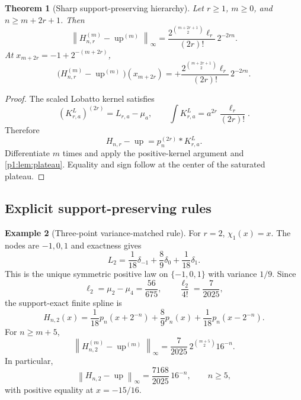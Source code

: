 \documentclass[11pt]{article}
\numberwithin{equation}{section}
\newtheorem{theorem}{Theorem}[section]
\theoremstyle{definition}
\newtheorem{example}[theorem]{Example}
\theoremstyle{remark}
\newcommand{\Up}{\operatorname{up}}
\newcommand{\norm}[1]{\left\lVert#1\right\rVert}
\begin{document}
\begin{theorem}[Sharp support-preserving hierarchy]
\label{p1:thm:L-exact}
Let $r\ge1$, $m\ge0$, and $n\ge m+2r+1$.  Then
\begin{equation}
 \boxed{
 \norm{H_{n,r}^{(m)}-\Up^{(m)}}_\infty
 =\frac{2^{\binom{m+2r+1}{2}}\ell_r}{(2r)!}\,2^{-2rn}.}
 \label{p1:eq:L-exact}
\end{equation}
At $x_{m+2r}=-1+2^{-(m+2r)}$,
\begin{equation}
 \boxed{
 \bigl(H_{n,r}^{(m)}-\Up^{(m)}\bigr)(x_{m+2r})
 =+\frac{2^{\binom{m+2r+1}{2}}\ell_r}{(2r)!}\,2^{-2rn}.}
 \label{p1:eq:L-signed}
\end{equation}
\end{theorem}

\begin{proof}
The scaled Lobatto kernel satisfies
\[
 (K_{r,a}^L)^{(2r)}=L_{r,a}-\mu_a,
 \qquad
 \int K_{r,a}^L=a^{2r}\frac{\ell_r}{(2r)!}.
\]
Therefore
\begin{equation}
 H_{n,r}-\Up=p_n^{(2r)}*K_{r,a}^L.
 \label{p1:eq:L-factorization}
\end{equation}
Differentiate $m$ times and apply the positive-kernel argument and \cref{p1:lem:plateau}.  Equality and sign follow at the center of the saturated plateau.
\end{proof}

\subsection{Explicit support-preserving rules}

\begin{example}[Three-point variance-matched rule]
For $r=2$, $\chi_1(x)=x$.  The nodes are $-1,0,1$ and exactness gives
\begin{equation}
 L_2=\frac1{18}\delta_{-1}+\frac89\delta_0+\frac1{18}\delta_1.
 \label{p1:eq:L2}
\end{equation}
This is the unique symmetric positive law on $\{-1,0,1\}$ with variance $1/9$.  Since
\[
 \ell_2=\mu_2-\mu_4=\frac{56}{675},
 \qquad
 \frac{\ell_2}{4!}=\frac7{2025},
\]
the support-exact finite spline is
\begin{equation}
 \boxed{
 H_{n,2}(x)=\frac1{18}p_n(x+2^{-n})
 +\frac89p_n(x)
 +\frac1{18}p_n(x-2^{-n}).}
 \label{p1:eq:Hn2}
\end{equation}
For $n\ge m+5$,
\begin{equation}
 \boxed{
 \norm{H_{n,2}^{(m)}-\Up^{(m)}}_\infty
 =\frac7{2025}\,2^{\binom{m+5}{2}}16^{-n}.}
 \label{p1:eq:Hn2-error}
\end{equation}
In particular,
\begin{equation}
 \boxed{
 \norm{H_{n,2}-\Up}_\infty
 =\frac{7168}{2025}\,16^{-n},\qquad n\ge5,}
 \label{p1:eq:Hn2-uniform}
\end{equation}
with positive equality at $x=-15/16$.
\end{example}
\end{document}

